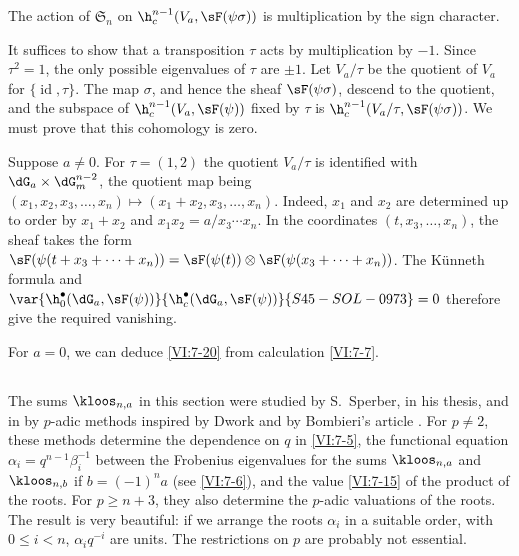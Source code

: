 \begin{proposition_}\label{VI:7-20}
The action of $\mathfrak{S}_n$ on $\h_c^{n-1}(V_a,\sF(\psi\sigma))$ is multiplication 
by the sign character. 
\end{proposition_}

It suffices to show that a transposition $\tau$ acts by multiplication 
by $-1$. Since $\tau^2=1$, the only possible eigenvalues of $\tau$ are 
$\pm 1$. Let $V_a/\tau$ be the quotient of $V_a$ for 
$\{\operatorname{id},\tau\}$. The map $\sigma$, and hence the sheaf 
$\sF(\psi\sigma)$, descend to the quotient, and the subspace of 
  $\h_c^{n-1}(V_a,\sF(\psi))$ fixed by 
$\tau$ is $\h_c^{n-1}(V_a/\tau,\sF(\psi\sigma))$. We must prove that 
this cohomology is zero. 

Suppose $a\ne 0$. For $\tau=(1,2)$ the quotient $V_a/\tau$ is identified 
with $\dG_a\times \dG_m^{n-2}$, the quotient map being 
$(x_1,x_2,x_3,\dots,x_n)\mapsto (x_1+x_2,x_3,\dots,x_n)$. Indeed, $x_1$ and 
$x_2$ are determined 
up to order by $x_1+x_2$ and 
$x_1x_2 = a/x_3\dotsm x_n$. In the coordinates $(t,x_3,\dots,x_n)$, the 
sheaf takes the form 
$\sF(\psi(t+x_3+\cdots + x_n)) = \sF(\psi(t))\otimes \sF(\psi(x_3+\cdots + x_n))$. 
  The K\"unneth formula and $\var{\h_0^\bullet(\dG_a,\sF(\psi))}{\h_c^\bullet(\dG_a,\sF(\psi))}{S45-SOL-0973} = 0$ therefore give 
the required vanishing. 

For $a=0$, we can deduce \ref{VI:7-20} from calculation \ref{VI:7-7}. 





\subsection{}\label{VI:7-21}

The sums $\kloos_{n,a}$ in this section were studied by 
S.\ Sperber, in his thesis, and in  by 
$p$-adic methods inspired by Dwork and by Bombieri's article . 
For $p\ne 2$, these methods determine the dependence on $q$ in \ref{VI:7-5}, 
the functional equation $\alpha_i = q^{n-1} \beta_i^{-1}$ between the 
Frobenius eigenvalues for the sums $\kloos_{n,a}$ and 
$\kloos_{n,b}$ if $b=(-1)^n a$ (see \ref{VI:7-6}), and the value \ref{VI:7-15} 
of the product of the roots. For $p\geqslant n+3$, they also determine the 
$p$-adic valuations of the roots. The result is very beautiful: if we arrange 
the roots $\alpha_i$ in a suitable order, with 
  $0\leqslant i<n$, $\alpha_i q^{-i}$ are units. The 
restrictions on $p$ are probably not essential. 










